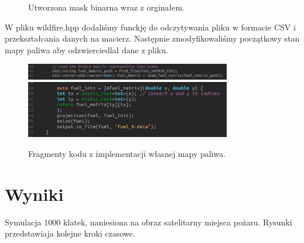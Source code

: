 \documentclass[a4paper,12pt]{article}
\begin{document}
\begin{figure}[H]
    \centering
    \qquad
    \caption{Utworzona mask binarna wraz z orginałem.}%
    \label{fig:example}%
\end{figure}

W pliku wildfire.hpp dodaliśmy funckję do odczytywania pliku w formacie CSV i przekształcania danych na macierz. Następnie zmodyfikowaliśmy początkowy stan mapy paliwa aby odzwierciedlał dane z pliku.

\begin{figure}[H]
    \centering
    \includegraphics[width=0.8\textwidth]{fuel_map.png}
    \includegraphics[width=0.8\textwidth]{fuel_map1.png}
    \caption{Fragmenty kodu z implementacji własnej mapy paliwa.}
    \label{fig:example}
\end{figure}

\newpage
\section{Wyniki}
Symulacja 1000 klatek, naniesiona na obraz satelitarny miejsca pożaru. Rysunki przedstawiaja kolejne kroki czasowe.
\end{document}
